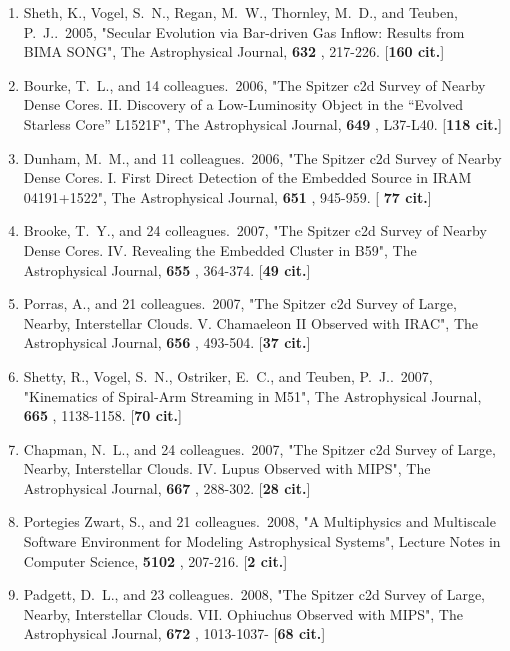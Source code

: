 \documentclass[11pt,letterpaper]{article}
\begin{document}
\begin{enumerate}[resume,label=\textbf{\arabic*}.]
\item  
Sheth, K., Vogel, S.~N., Regan, M.~W., Thornley, M.~D., and Teuben, P.~J..\  
2005,  "Secular Evolution via Bar-driven Gas Inflow: Results from BIMA 
SONG", The Astrophysical Journal,  {\bf 632} , 217-226.  [{\bf 160 cit.}] 

\item  
Bourke, T.~L., and 14 colleagues.\  2006,  "The Spitzer c2d Survey of 
Nearby Dense Cores. II. Discovery of a Low-Luminosity Object in the 
``Evolved Starless Core'' L1521F", The Astrophysical Journal,  {\bf 649} , 
L37-L40.  [{\bf 118 cit.}] 

\item  
Dunham, M.~M., and 11 colleagues.\  2006,  "The Spitzer c2d Survey of 
Nearby Dense Cores. I. First Direct Detection of the Embedded Source in 
IRAM 04191+1522", The Astrophysical Journal,  {\bf 651} , 945-959.  [{\bf 
77 cit.}] 

\item  
Brooke, T.~Y., and 24 colleagues.\  2007,  "The Spitzer c2d Survey of 
Nearby Dense Cores. IV. Revealing the Embedded Cluster in B59", The 
Astrophysical Journal,  {\bf 655} , 364-374.  [{\bf 49 cit.}] 

\item  
Porras, A., and 21 colleagues.\  2007,  "The Spitzer c2d Survey of Large, 
Nearby, Interstellar Clouds. V. Chamaeleon II Observed with IRAC", The 
Astrophysical Journal,  {\bf 656} , 493-504.  [{\bf 37 cit.}] 

\item  
Shetty, R., Vogel, S.~N., Ostriker, E.~C., and Teuben, P.~J..\  2007,  
"Kinematics of Spiral-Arm Streaming in M51", The Astrophysical Journal,  
{\bf 665} , 1138-1158.  [{\bf 70 cit.}] 

\item  
Chapman, N.~L., and 24 colleagues.\  2007,  "The Spitzer c2d Survey of 
Large, Nearby, Interstellar Clouds. IV. Lupus Observed with MIPS", The 
Astrophysical Journal,  {\bf 667} , 288-302.  [{\bf 28 cit.}] 

\item  
Portegies Zwart, S., and 21 colleagues.\  2008,  "A Multiphysics and 
Multiscale Software Environment for Modeling Astrophysical Systems", 
Lecture Notes in Computer Science,  {\bf 5102} , 207-216.  [{\bf 2 cit.}] 

\item  
Padgett, D.~L., and 23 colleagues.\  2008,  "The Spitzer c2d Survey of 
Large, Nearby, Interstellar Clouds. VII. Ophiuchus Observed with MIPS", The 
Astrophysical Journal,  {\bf 672} , 1013-1037- [{\bf 68 cit.}] 


\end{enumerate}
\end{document}
